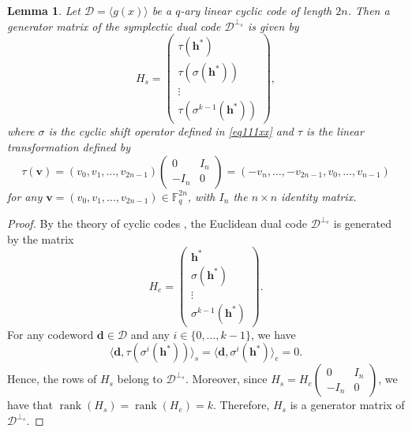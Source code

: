 \documentclass{aims}
\numberwithin{equation}{section}
\newtheorem{lemma}[theorem]{Lemma}
\theoremstyle{definition}
\newcommand{\F}{\mathbb{F}}
\begin{document}
\begin{lemma}\label{lem:dualgen}
	Let $\mathcal{D} = \langle g(x) \rangle$ be a $q$-ary linear cyclic code of length $2n$. Then a generator matrix of the symplectic dual code $\mathcal{D}^{\perp_s}$ is given by
	\[
	H_s = \begin{pmatrix}
		\tau(\pmb{h^*}) \\
		\tau(\sigma(\pmb{h^*})) \\
		\vdots \\
		\tau(\sigma^{k-1}(\pmb{h^*}))
	\end{pmatrix},
	\]
	where $\sigma$ is the cyclic shift operator defined in \eqref{eq111xx} and $\tau$ is the linear transformation defined by
	\[
	\tau(\mathbf{v}) = (v_0, v_1, \dots, v_{2n-1}) \begin{pmatrix} 0 & I_n \\ -I_n & 0 \end{pmatrix} = (-v_n, \dots, -v_{2n-1}, v_0, \dots, v_{n-1})
	\]
	for any $\mathbf{v} = (v_0, v_1, \dots, v_{2n-1}) \in \F_q^{2n}$, with $I_n$ the $n \times n$ identity matrix.
\end{lemma}
\begin{proof}
	By the theory of cyclic codes \cite{huffman2003}, the Euclidean dual code $\mathcal{D}^{\perp_e}$ is generated by the matrix
	\[
	H_e = \begin{pmatrix}
		\pmb{h^*} \\
		\sigma(\pmb{h^*}) \\
		\vdots \\
		\sigma^{k-1}(\pmb{h^*})
	\end{pmatrix}.
	\]
	For any codeword $\mathbf{d} \in \mathcal{D}$ and any $i \in \{0, \dots, k-1\}$, we have
	\[
	\langle \mathbf{d}, \tau(\sigma^i(\pmb{h^*})) \rangle_s = \langle \mathbf{d}, \sigma^i(\pmb{h^*}) \rangle_e = 0.
	\]
	Hence, the rows of $H_s$ belong to $\mathcal{D}^{\perp_s}$. Moreover, since $H_s = H_e \begin{pmatrix} 0 & I_n \\ -I_n & 0 \end{pmatrix}$, we have that $\operatorname{rank}(H_s) = \operatorname{rank}(H_e) = k$. Therefore, $H_s$ is a generator matrix of $\mathcal{D}^{\perp_s}$.
\end{proof}
\end{document}

